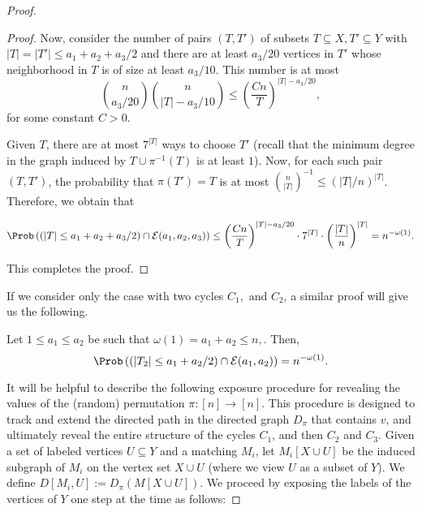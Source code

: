 \documentclass{article}
\begin{document}
\begin{proof}
\begin{proof}
Now, consider the number of pairs $(T,T')$ of subsets $T\subseteq X, T'\subseteq Y$ with $|T|=|T'|\leq a_1+a_2+a_3/2$ and there are at least $a_3/20$ vertices in $T'$ whose neighborhood in $T$ is of size at least $a_3/10$. This number is at most 
$$\binom{n}{a_3/20}\binom{n}{|T|-a_3/10}\leq \left(\frac{Cn}{T}\right)^{|T|-a_3/20},$$
for some constant $C>0$. 

Given $T$, there are at most $7^{|T|}$ ways to choose $T'$ (recall that the minimum degree in the graph induced by $T\cup \pi^{-1}(T)$ is at least $1$). Now, for each such pair $(T,T')$, the probability that $\pi(T')=T$ is at most $\binom{n}{|T|}^{-1}\leq (|T|/n)^{|T|}$. Therefore, we obtain that 

$$ \Prob\left((|T|\leq a_1+a_2+a_3/2)\cap \mathcal E(a_1,a_2,a_3) \right)\leq \left(\frac{Cn}{T}\right)^{|T|-a_3/20}\cdot 7^{|T|}\cdot \left(\frac{|T|}{n}\right)^{|T|}=n^{-\omega(1)}. $$

This completes the proof.
\end{proof}

If we consider only the case with two cycles $C_1,$ and $C_2$, a similar proof will give us the following.

\begin{claim}\label{cl:large2} Let $1\leq a_1\leq a_2$ be such that $\omega(1)=a_1+a_2\leq n,$. Then, 
    $$\Prob\left((|T_2|\leq a_1+a_2/2)\cap \mathcal E(a_1,a_2)\right)=n^{-\omega(1)}.$$
\end{claim}

It will be helpful to describe the following exposure procedure for revealing the values of the (random) permutation $\pi: [n] \to [n]$. This procedure is designed to track and extend the directed path in the directed graph $D_{\pi}$ that contains $v$, and ultimately reveal the entire structure of the cycles $C_1$, and then $C_2$ and $C_3$. Given a set of labeled vertices $U\subseteq Y$ and a matching $M_i$, let $M_i[X\cup U]$ be the induced subgraph of $M_i$ on the vertex set $X\cup U$ (where we view $U$ as a subset of $Y$). We define $D[M_i,U]:=D_\pi(M[X\cup U])$. We proceed by exposing the labels of the vertices of $Y$ one step at the time as follows:


\end{proof}
\end{document}

